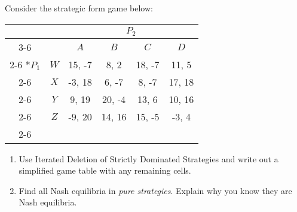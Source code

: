 \documentclass{article}
\begin{document}
\newpage

\begin{question}%

Consider the strategic form game below:

\begin{table}[!h]
  \begin{center}
    \begin{tabular}{*{6}{c|}}
      \multicolumn{2}{c}{} & \multicolumn{4}{c}{$P_2$} \\ \cline{3-6}
      \multicolumn{1}{c}{} &  & $A$ & $B$ & $C$ & $D$ \\ \cline{2-6} 
      \multirow{4}*{$P_1$}
      & $W$ & 15, -7 &  8,  2 & 18, -7 & 11,  5 \\ \cline{2-6}
      & $X$ & -3, 18 &  6, -7 &  8, -7 & 17, 18 \\ \cline{2-6} 
      & $Y$ &  9, 19 & 20, -4 & 13,  6 & 10, 16 \\ \cline{2-6} 
      & $Z$ & -9, 20 & 14, 16 & 15, -5 & -3,  4 \\ \cline{2-6} 
  \end{tabular}
  \end{center}
\end{table}

\begin{enumerate}
 
  \item 
  Use Iterated Deletion of Strictly Dominated Strategies
  and write out a simplified game table with any remaining cells.

  \vspace{50mm}

  \item
  Find all Nash equilibria in \textit{pure strategies}.
  Explain why you know they are Nash equilibria.

  \vspace{50mm}
  






\end{enumerate}
\end{question}
\end{document}
